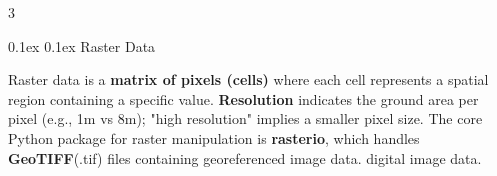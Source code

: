 \documentclass[8pt,landscape]{article}
\makeatletter
\renewcommand{\section}{\@startsection{section}{2}{0pt}%
    {0.1ex}%
    {0.1ex}%
    {\fontsize{8}{9}\bfseries\color{red}}} %
\newcommand{\smalltext}[1]{
  {\fontsize{8}{9}\selectfont\sloppy #1\par}
}
\makeatother
\begin{document}
\begin{multicols}{3}

\section{Raster Data}
\smalltext{
Raster data is a \textbf{matrix of pixels (cells)} where each cell represents a spatial region containing a specific value. \textbf{Resolution} indicates the ground area per pixel (e.g., 1m vs 8m); "high resolution" implies a smaller pixel size. The core Python package for raster manipulation is \textbf{rasterio}, which handles \textbf{GeoTIFF}(.tif) files containing georeferenced image data. digital image data.
}


\end{multicols}
\end{document}
